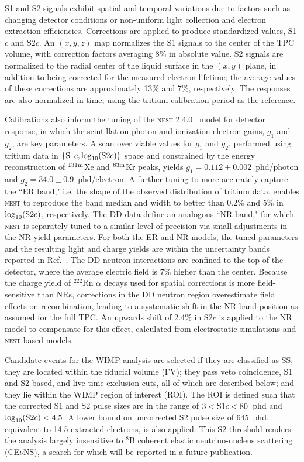 \documentclass[%
 reprint,
 superscriptaddress,
 amsmath,amssymb,
 prl,
floatfix,
]{revtex4-2}
\newcommand{\RevA}[1]{{\color{black}#1}}
\newcommand\sonec{S1${c}$}
\newcommand\stwoc{S2${c}$}
\begin{document}
S1 and S2 signals exhibit spatial and temporal variations due to factors such as changing detector conditions or non-uniform light collection and electron extraction efficiencies. Corrections are applied to produce standardized values, \sonec{} and \stwoc{}. An $(x,y,z)$ map normalizes the S1 signals to the center of the TPC volume, with correction factors averaging 8\% in absolute value. S2 signals are normalized to the radial center of the liquid surface in the $(x,y)$ plane, in addition to being corrected for the \RevA{measured electron lifetime}; the average values of these corrections are approximately 13\% and 7\%, respectively. The responses are also normalized in time, using the tritium calibration period as the reference. 

Calibrations also inform the tuning of the \textsc{nest} 2.4.0~\cite{nest_2_4_0} model for detector response, in which the scintillation photon and ionization electron gains, $g_1$ and $g_2$, are key parameters. A scan over viable values for $g_1$ and $g_2$, performed using tritium data in $\{{\rm S1}c, \text{log}_{10}({\rm S2}c) \}$ space and constrained by the energy reconstruction of $^{131{\rm m}}$Xe and $^{83{\rm m}}$Kr peaks, yields $g_1 = 0.112\pm0.002$~phd/photon and $g_2 = 34.0\pm0.9$~phd/electron. A further tuning to more accurately capture the ``ER band," i.e. the shape of the observed distribution of tritium data, enables \textsc{nest} to reproduce the band median and width to better than 0.2\% and 5\% in $\log_{10}({\rm S2}c)$, respectively. The DD data define an analogous ``NR band," for which \textsc{nest} is separately tuned to a similar level of precision via small adjustments in the NR yield parameters. \RevA{For both the ER and NR models, the tuned parameters and the resulting light and charge yields are within the uncertainty bands reported in Ref.~\cite{szydagis2022review}.} The DD neutron interactions are confined to the top of the detector, where the average electric field is 7\% higher than the center. Because the charge yield of $^{222}$Rn $\alpha$ decays used for spatial corrections is more field-sensitive than NRs, corrections in the DD neutron region overestimate field effects on recombination, leading to a systematic shift in the NR band position as assumed for the full TPC. An upwards shift of 2.4\% in \stwoc{} is applied to the NR model to compensate for this effect, calculated from electrostatic simulations and \textsc{nest}-based models.

Candidate events for the WIMP analysis are selected if they are classified as SS; they are located within the fiducial volume (FV); they pass veto coincidence, S1 and S2-based, and live-time exclusion cuts, all of which are described below; and they lie within the WIMP region of interest (ROI). The ROI is defined such that the corrected S1 and S2 pulse sizes are in the range of $3<{\rm S1}c<80$~phd and $\log_{10}({\rm S2}c)<4.5$. A lower bound on uncorrected S2 pulse size of 645~phd, equivalent to 14.5 extracted electrons, is also applied. This S2 threshold renders the analysis largely insensitive to $^8$B coherent elastic neutrino-nucleus scattering (CE$\nu$NS), a search for which will be reported in a future publication.
\end{document}
